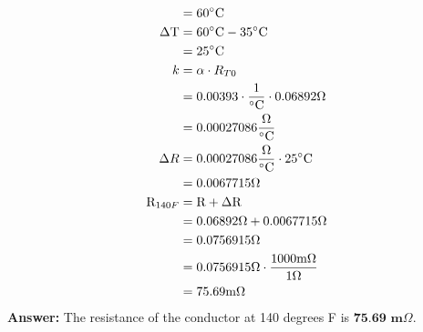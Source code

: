 \documentclass{article}
\begin{document}
\begin{itemize}
\begin{align*}
				&= 60 ^{\circ} \text{C} \\
			\Delta \text{T} &= 60 ^{\circ} \text{C} - 35 ^{\circ} \text{C} \\
				&= 25 ^{\circ} \text{C} \\
			k &= \alpha \cdot R_{T0} \\
				&= 0.00393 \cdot { 1 \over ^{\circ} \text{C}} \cdot 0.06892 \Omega \\
				&= 0.00027086 { \Omega \over ^{\circ} \text{C} } \\
			\Delta R &= 0.00027086 { \Omega \over ^{\circ} \text{C} } \cdot 25 ^{\circ} \text{C} \\
				&= 0.0067715 \Omega \\
			\text{R}_{140F} &= \text{R} + \Delta \text{R} \\
				&= 0.06892 \Omega + 0.0067715 \Omega \\
				&= 0.0756915 \Omega \\
				&= 0.0756915 \Omega \cdot { 1000 \text{m} \Omega \over 1 \Omega } \\
				&= 75.69 \text{m} \Omega
		\end{align*}
		\textbf{Answer:} The resistance of the conductor at 140 degrees F is \textbf{$ \textbf{75.69 m} \Omega$}.
\end{itemize}

\newpage
\end{document}
